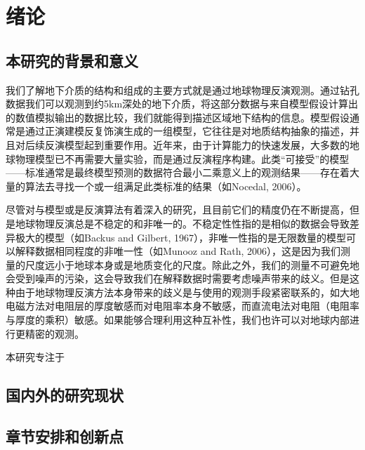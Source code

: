 \cleardoublepage

\section{绪论}

\subsection{本研究的背景和意义}

我们了解地下介质的结构和组成的主要方式就是通过地球物理反演观测。通过钻孔数据我们可以观测到约5km深处的地下介质，将这部分数据与来自模型假设计算出的数值模拟输出的数据比较，我们就能得到描述区域地下结构的信息。模型假设通常是通过正演建模反复饰演生成的一组模型，它往往是对地质结构抽象的描述，并且对后续反演模型起到重要作用。近年来，由于计算能力的快速发展，大多数的地球物理模型已不再需要大量实验，而是通过反演程序构建。此类“可接受”的模型——标准通常是最终模型预测的数据符合最小二乘意义上的观测结果——存在着大量的算法去寻找一个或一组满足此类标准的结果（如Nocedal, 2006）。

尽管对与模型或是反演算法有着深入的研究，且目前它们的精度仍在不断提高，但是地球物理反演总是不稳定的和非唯一的。不稳定性性指的是相似的数据会导致差异极大的模型（如Backus and Gilbert, 1967），非唯一性指的是无限数量的模型可以解释数据相同程度的非唯一性（如Munooz and Rath, 2006），这是因为我们测量的尺度远小于地球本身或是地质变化的尺度。除此之外，我们的测量不可避免地会受到噪声的污染，这会导致我们在解释数据时需要考虑噪声带来的歧义。但是这种由于地球物理反演方法本身带来的歧义是与使用的观测手段紧密联系的，如大地电磁方法对电阻层的厚度敏感而对电阻率本身不敏感，而直流电法对电阻（电阻率与厚度的乘积）敏感。如果能够合理利用这种互补性，我们也许可以对地球内部进行更精密的观测。

本研究专注于
\subsection{国内外的研究现状}


\subsection{章节安排和创新点}


